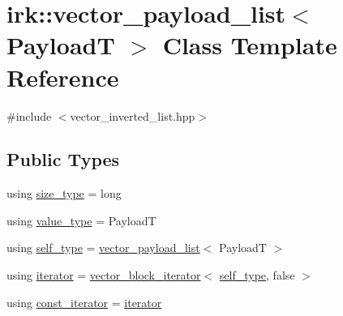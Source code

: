 \hypertarget{classirk_1_1vector__payload__list}{}\section{irk\+:\+:vector\+\_\+payload\+\_\+list$<$ PayloadT $>$ Class Template Reference}
\label{classirk_1_1vector__payload__list}


{\ttfamily \#include $<$vector\+\_\+inverted\+\_\+list.\+hpp$>$}

\subsection*{Public Types}
\begin{DoxyCompactItemize}
\item 
using \mbox{\hyperlink{classirk_1_1vector__payload__list_a319d51342d589c056943998b362120ca}{size\+\_\+type}} = long
\item 
using \mbox{\hyperlink{classirk_1_1vector__payload__list_acded07bf18f4c147495e0b0dfdbf8922}{value\+\_\+type}} = PayloadT
\item 
using \mbox{\hyperlink{classirk_1_1vector__payload__list_a9312dea19fb0ee4e9c35e0def20e14d5}{self\+\_\+type}} = \mbox{\hyperlink{classirk_1_1vector__payload__list}{vector\+\_\+payload\+\_\+list}}$<$ PayloadT $>$
\item 
using \mbox{\hyperlink{classirk_1_1vector__payload__list_a33f425e324f556bba403c1700ff9915e}{iterator}} = \mbox{\hyperlink{classirk_1_1vector__block__iterator}{vector\+\_\+block\+\_\+iterator}}$<$ \mbox{\hyperlink{classirk_1_1vector__payload__list_a9312dea19fb0ee4e9c35e0def20e14d5}{self\+\_\+type}}, false $>$
\item 
using \mbox{\hyperlink{classirk_1_1vector__payload__list_abed614e4a2dad1f6ed890102297af020}{const\+\_\+iterator}} = \mbox{\hyperlink{classirk_1_1vector__payload__list_a33f425e324f556bba403c1700ff9915e}{iterator}}
\end{DoxyCompactItemize}
